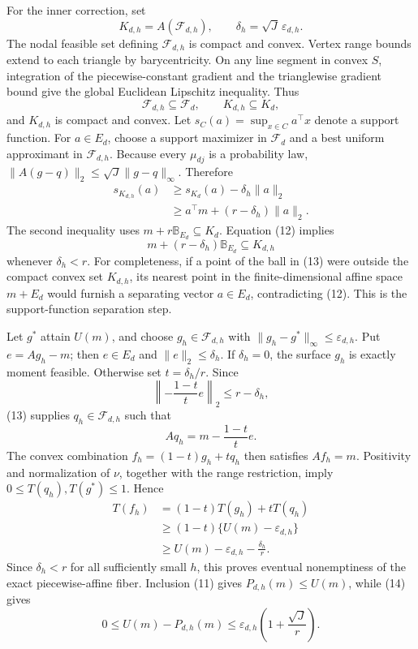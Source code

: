 For the inner correction, set
\[
 K_{d,h}=A(\mathcal F_{d,h}),
 \qquad
 \delta_h=\sqrt J\,\varepsilon_{d,h}.
\]
The nodal feasible set defining \(\mathcal F_{d,h}\) is compact and convex.
Vertex range bounds extend to each triangle by barycentricity.  On any line
segment in convex \(S\), integration of the piecewise-constant gradient and
the trianglewise gradient bound give the global Euclidean Lipschitz inequality.
Thus
\[
 \mathcal F_{d,h}\subseteq\mathcal F_d,
 \qquad K_{d,h}\subseteq K_d,                               \tag{11}
\]
and \(K_{d,h}\) is compact and convex.  Let \(s_C(a)=\sup_{x\in C}a^\top x\)
denote a support function.  For \(a\in E_d\), choose a support maximizer in
\(\mathcal F_d\) and a best uniform approximant in \(\mathcal F_{d,h}\).
Because every \(\mu_{dj}\) is a probability law,
\(\|A(g-q)\|_2\le\sqrt J\|g-q\|_\infty\).  Therefore
\begin{align}
 s_{K_{d,h}}(a)
 &\ge s_{K_d}(a)-\delta_h\|a\|_2\\
 &\ge a^\top m+(r-\delta_h)\|a\|_2.                        \tag{12}
\end{align}
The second inequality uses
\(m+r\mathbb B_{E_d}\subseteq K_d\).  Equation (12) implies
\[
 m+(r-\delta_h)\mathbb B_{E_d}\subseteq K_{d,h}             \tag{13}
\]
whenever \(\delta_h<r\).  For completeness, if a point of the ball in (13)
were outside the compact convex set \(K_{d,h}\), its nearest point in the
finite-dimensional affine space \(m+E_d\) would furnish a separating vector
\(a\in E_d\), contradicting (12).  This is the support-function separation
step.

Let \(g^*\) attain \(U(m)\), and choose
\(g_h\in\mathcal F_{d,h}\) with
\(\|g_h-g^*\|_\infty\le\varepsilon_{d,h}\).  Put
\(e=Ag_h-m\); then \(e\in E_d\) and \(\|e\|_2\le\delta_h\).  If
\(\delta_h=0\), the surface \(g_h\) is exactly moment feasible.  Otherwise set
\(t=\delta_h/r\).  Since
\[
 \left\|-\frac{1-t}{t}e\right\|_2
 \le r-\delta_h,
\]
(13) supplies \(q_h\in\mathcal F_{d,h}\) such that
\[
 Aq_h=m-\frac{1-t}{t}e.
\]
The convex combination \(f_h=(1-t)g_h+tq_h\) then satisfies
\(Af_h=m\).  Positivity and normalization of \(\nu\), together with the range
restriction, imply \(0\le T(q_h),T(g^*)\le1\).  Hence
\begin{align}
 T(f_h)
 &=(1-t)T(g_h)+tT(q_h)\\
 &\ge(1-t)\{U(m)-\varepsilon_{d,h}\}\\
 &\ge U(m)-\varepsilon_{d,h}-\frac{\delta_h}{r}.            \tag{14}
\end{align}
Since \(\delta_h<r\) for all sufficiently small \(h\), this proves eventual
nonemptiness of the exact piecewise-affine fiber.  Inclusion (11) gives
\(P_{d,h}(m)\le U(m)\), while (14) gives
\[
 0\le U(m)-P_{d,h}(m)
 \le\varepsilon_{d,h}\left(1+\frac{\sqrt J}{r}\right).     \tag{15}
\]

